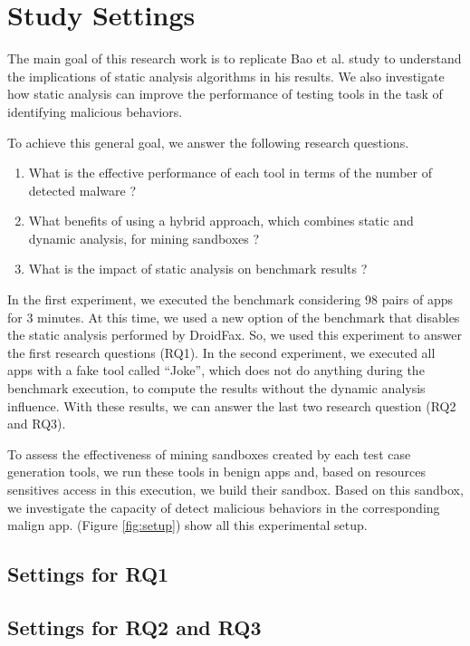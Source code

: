 \section{Study Settings}

The main goal of this research work is to replicate Bao et al. study to understand the implications of static analysis algorithms in his results. We also investigate how static analysis can improve the performance of testing tools in the task of identifying malicious behaviors. 

To achieve this general goal, we answer the following research questions. 

\begin{enumerate}[(RQ1)]
\item What is the effective performance of each tool in terms of the number of detected malware ?
\item What benefits of using a hybrid approach, which combines static and dynamic analysis, for mining sandboxes ?
\item What is the impact of static analysis on benchmark results ?
\end{enumerate}

In the first experiment, we executed the benchmark considering 98 pairs of apps for 3 minutes. At this time, we used a new option of the benchmark that disables the static analysis performed by DroidFax. So, we used this experiment to answer the first research questions (RQ1). In the second experiment, we executed all apps with a fake tool called “Joke”, which does not do anything during the benchmark execution, to compute the results without the dynamic analysis influence. With these results, we can answer the last two research question (RQ2 and RQ3).

To assess the effectiveness of mining sandboxes created by each test case generation tools, we run these tools in benign apps and, based on resources sensitives access in this execution, we build their sandbox. Based on this sandbox, we investigate the capacity of detect malicious behaviors in the corresponding malign app. (Figure  \ref{fig:setup}) show all this experimental setup.

\subsection{Settings for RQ1}

\subsection{Settings for RQ2 and RQ3}


